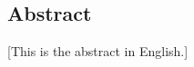 \begin{otherlanguage}{english}

\chapter*{Abstract}

[This is the abstract in English.]

\lipsum[1]

\end{otherlanguage}

